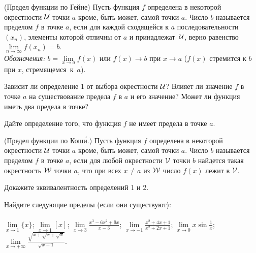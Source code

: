 \documentclass[a4paper, 12pt]{article}
\newcommand{\0}[1]{\overline{#1}}
\begin{document}


 \label{lim2} {\small\sc (Предел функции по Гейне)} Пусть функция $f$ определена
в некоторой окрестности $\cal U$ точки $a$ кроме, быть может, самой точки $a$.
Число $b$ называется пределом $f$ в точке $a$, если
для каждой сходящейся к $a$ последовательности $(x_n)$,
элементы которой отличны от $a$ и принадлежат~$\cal U$, верно равенство $\lim\limits_{n \to \infty} f(x_n)=b$.\\
{\sl Обозначения:}
$b=\lim\limits_{x \to a} f(x)$ или $f(x)\to b$ при $x\to a$
( $f(x)$ стремится к $b$ при $x$, стремящемся~к~$a$).

 Зависит ли определение 1 от выбора окрестности $\cal U$?
 Влияет ли значение $f$ в точке $a$ на существование предела $f$ в $a$ и его значение?
 Может ли функция иметь два предела в точке?

 Дайте определение того, что функция $f$ не имеет предела в точке $a$.

 \label{epsilon-delta}  {\small\sc (Предел функции по Кош\'и.)}
Пусть функция $f$ определена в некоторой окрестности $\cal U$ точки $a$ кроме, быть может, самой точки $a$.
Число $b$ называется пределом $f$ в точке $a$, если для любой окрестности $\cal V$ точки $b$
найдется такая окрестность $\cal W$ точки $a$, что при всех $x\ne a$ из $\cal W$
число $f(x)$ лежит в $\cal V$.

Докажите эквивалентность определений 1 и 2.


\label{example}  Найдите следующие пределы (если они существуют):\\
\vspace*{-19pt}
\\
 $\lim\limits_{x\to1}\{ x\}$;
 $\lim\limits_{x\to1}[x]$;
 $\lim\limits_{x \to 3} \frac{x^3-6x^2+9x}{x-3}$;
 $\lim\limits_{x \to -1} \frac{x^2+4x+1}{x^2+2x+1}$;
 $\lim\limits_{x \to 0} x\sin \frac1x$;
 $\lim\limits_{x \to +\infty} \frac{\sqrt{x+\sqrt{x+\sqrt x}}}{\sqrt{x+1}}$.
\end{document}
